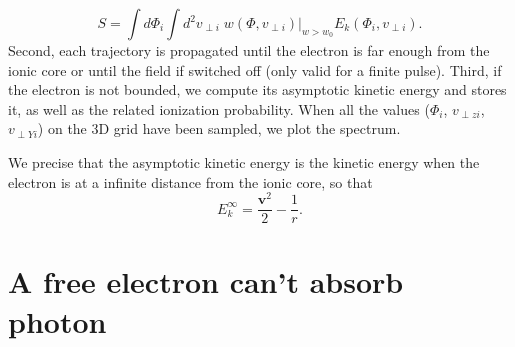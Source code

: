 \documentclass[a4paper]{article}
\begin{document}
\begin{equation}
S= \int d\Phi_{i} \int d^{2}v_{\perp i}  \; \left. w(\Phi, v_{\perp i}) \right\vert_{w>w_{0}}  E_{k}(\Phi_{i}, v_{\perp i}).
\end{equation}
Second, each trajectory is propagated until the electron is far enough from the ionic core or until the field if switched off (only valid for a finite pulse). 
Third, if the electron is not bounded, we compute its asymptotic kinetic energy and stores it, as well as the related ionization probability.
When all the values ($\Phi_{i}$, $v_{\perp z i}$, $v_{\perp Y i}$) on the 3D grid have been sampled, we plot the spectrum.
\par 
We precise that the asymptotic kinetic energy is the kinetic energy when the electron is at a infinite distance from the ionic core, so that
\begin{equation}
\label{asymptotic_kinetic_energy}
E_{k}^{\infty}=\frac{\mathbf{v}^{2}}{2}-\frac{1}{r}.
\end{equation}


\section{A free electron can't absorb photon}
\label{free_electron}
\end{document}

